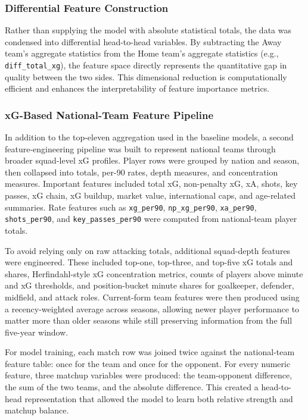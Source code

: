 \documentclass[11pt]{article}
\begin{document}
\subsubsection{Differential Feature Construction}
\label{subsec:differential_features}
Rather than supplying the model with absolute statistical totals, the data was condensed into differential head-to-head variables. By subtracting the Away team's aggregate statistics from the Home team's aggregate statistics (e.g., \texttt{diff\_total\_xg}), the feature space directly represents the quantitative gap in quality between the two sides. This dimensional reduction is computationally efficient and enhances the interpretability of feature importance metrics.

\subsubsection{xG-Based National-Team Feature Pipeline}
\label{subsec:xg_pipeline}
In addition to the top-eleven aggregation used in the baseline models, a second feature-engineering pipeline was built to represent national teams through broader squad-level xG profiles. Player rows were grouped by nation and season, then collapsed into totals, per-90 rates, depth measures, and concentration measures. Important features included total xG, non-penalty xG, xA, shots, key passes, xG chain, xG buildup, market value, international caps, and age-related summaries. Rate features such as \texttt{xg\_per90}, \texttt{np\_xg\_per90}, \texttt{xa\_per90}, \texttt{shots\_per90}, and \texttt{key\_passes\_per90} were computed from national-team player totals.

To avoid relying only on raw attacking totals, additional squad-depth features were engineered. These included top-one, top-three, and top-five xG totals and shares, Herfindahl-style xG concentration metrics, counts of players above minute and xG thresholds, and position-bucket minute shares for goalkeeper, defender, midfield, and attack roles. Current-form team features were then produced using a recency-weighted average across seasons, allowing newer player performance to matter more than older seasons while still preserving information from the full five-year window.

For model training, each match row was joined twice against the national-team feature table: once for the team and once for the opponent. For every numeric feature, three matchup variables were produced: the team-opponent difference, the sum of the two teams, and the absolute difference. This created a head-to-head representation that allowed the model to learn both relative strength and matchup balance.
\end{document}
